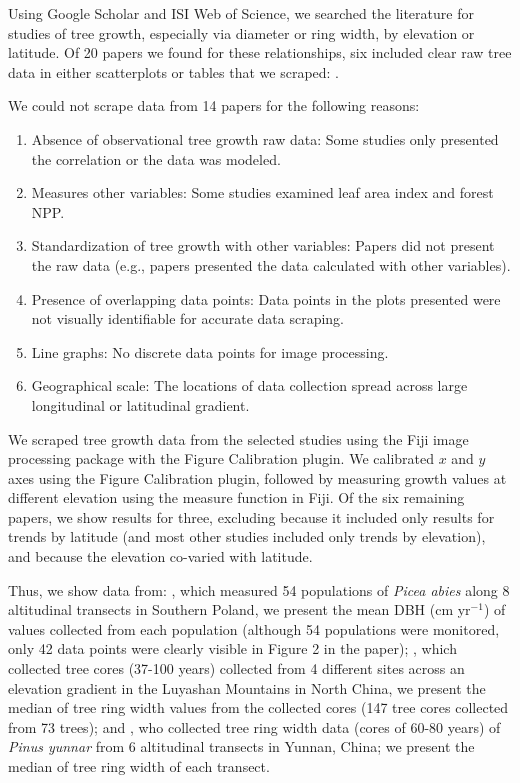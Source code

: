 \documentclass[11pt]{article}
\begin{document}
Using Google Scholar and ISI Web of Science, we searched the literature for studies of tree growth, especially via diameter or ring width, by elevation or latitude. Of 20 papers we found for these relationships, six included clear raw tree data in either scatterplots or tables that we scraped: \citet{oleksyn1998growth,huang2010radial,cavin2017highest,wang2017climatic,zhu2018spatial,zhou2022altitudinal}. 

We could not scrape data from 14 papers for the following reasons: 
\begin{enumerate}
\item Absence of observational tree growth raw data: Some studies only presented the correlation or the data was modeled. 
\item  Measures other variables: Some studies examined leaf area index and forest NPP. 
\item  Standardization of tree growth with other variables: Papers did not present the raw data (e.g., papers presented the data calculated with other variables).
\item  Presence of overlapping data points: Data points in the plots presented were not visually identifiable for accurate data scraping.
\item Line graphs: No discrete data points for image processing. 
\item Geographical scale: The locations of data collection spread across large longitudinal or latitudinal gradient. 
\end{enumerate}

We scraped tree growth data from the selected studies using the Fiji image processing package with the Figure Calibration plugin. We calibrated $x$ and $y$ axes using the Figure Calibration plugin, followed by measuring growth values at different elevation using the measure function in Fiji. Of the six remaining papers, we show results for three, excluding \citet{huang2010radial} because it included only results for trends by latitude (and most other studies included only trends by elevation), and \citet{cavin2017highest,zhu2018spatial} because the elevation co-varied with latitude. %

Thus, we show data from: \citet{oleksyn1998growth}, which measured 54 populations of  \emph{Picea abies} along 8 altitudinal transects in Southern Poland, we present the mean DBH (cm yr$^{-1}$) of values collected from each population (although 54 populations were monitored, only 42 data points were clearly visible in Figure 2 in the paper); \citet{wang2017climatic}, which collected  tree cores (37-100 years) collected from 4 different sites across an elevation gradient in the Luyashan Mountains in North China, we present the median of tree ring width values from the collected cores (147 tree cores collected from 73 trees); and \citet{zhou2022altitudinal}, who collected tree ring width data (cores of 60-80 years) of \emph{Pinus yunnar} from 6 altitudinal transects in Yunnan, China; we present the median of tree ring width of each transect.
\end{document}
